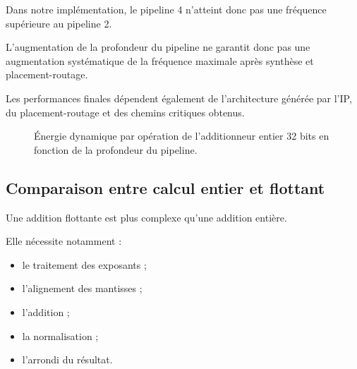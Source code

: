 \documentclass[12pt,a4paper]{article}
\begin{document}
Dans notre implémentation, le pipeline 4 n'atteint donc pas une
fréquence supérieure au pipeline 2.

L'augmentation de la profondeur du pipeline ne garantit donc pas
une augmentation systématique de la fréquence maximale après
synthèse et placement-routage.

Les performances finales dépendent également de l'architecture
générée par l'IP, du placement-routage et des chemins critiques
obtenus.

\begin{figure}[H]
\centering
{}
\caption{Énergie dynamique par opération de l'additionneur entier
32 bits en fonction de la profondeur du pipeline.}
\label{fig:energie_dyn_entier}
\end{figure}



\subsection{Comparaison entre calcul entier et flottant}

Une addition flottante est plus complexe qu'une addition entière.

Elle nécessite notamment :

\begin{itemize}
    \item le traitement des exposants ;
    \item l'alignement des mantisses ;
    \item l'addition ;
    \item la normalisation ;
    \item l'arrondi du résultat.
\end{itemize}
\end{document}
